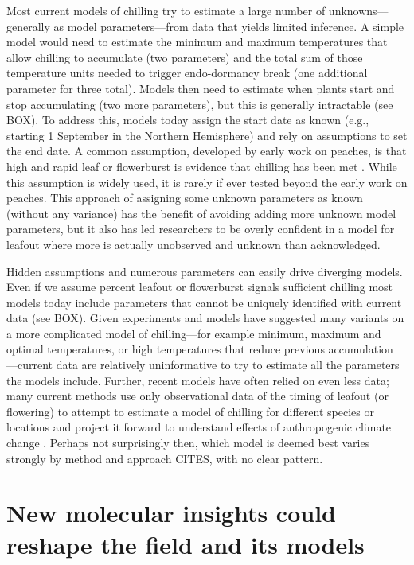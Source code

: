 \documentclass[11pt]{article}
\begin{document}
Most current models of chilling try to estimate a large number of unknowns---generally as model parameters---from data that yields limited inference. A simple model would need to estimate the minimum and maximum temperatures that allow chilling to accumulate (two parameters) and the total sum of those temperature units needed to trigger endo-dormancy break (one additional parameter for three total). Models then need to estimate  when plants start and stop accumulating (two more parameters), but this is generally intractable (see BOX). To address this, models today assign the start date as known (e.g., starting 1 September in the Northern Hemisphere) and rely on assumptions to set the end date. A common assumption, developed by early work on peaches, is that high and rapid leaf or flowerburst is evidence that chilling has been met \citep{erez1971}. While this assumption is widely used, it is rarely if ever tested beyond the early work on peaches. This approach of assigning some unknown parameters as known (without any variance) has the benefit of avoiding adding more unknown model parameters, but it also has led researchers to be overly confident in a model for leafout where more is actually unobserved and unknown than acknowledged. %

Hidden assumptions and numerous parameters can easily drive diverging models. Even if we assume percent leafout or flowerburst signals sufficient chilling most models today include parameters that cannot be uniquely identified with current data (see BOX).  Given experiments and models have suggested many variants on a more complicated model of chilling---for example minimum, maximum and optimal temperatures, or high temperatures that reduce previous accumulation \citep[Fig. \ref{fig:modelsketch}][]{lued2011,luedeling2012chilling,chuine2016}---current data are relatively uninformative to try to estimate all the parameters the models include. Further, recent models have often relied on even less data; many current methods use only observational data of the timing of leafout (or flowering) to attempt to estimate a model of chilling for different species or locations and project it forward to understand effects of anthropogenic climate change \citep{lued2011,luedeling2012chilling,gao2024}. Perhaps not surprisingly then, which model is deemed best varies strongly by method and approach CITES, with no clear pattern. 

\section*{New molecular insights could reshape the field and its models} 
\end{document}
